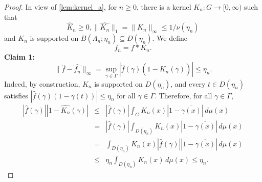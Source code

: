 \begin{proof}
In view of \cref{lem:kernel_a}, for $n \geq 0$, there is a kernel $K_n: G \to [0, \infty)$ such that
    \[
        \widehat{K}_n \geq 0,  \| \widehat{K_n}\|_1 = \lVert K_n \rVert_{\infty} \leq 1/\nu(\eta_n)
    \]
    and $K_n$ is supported on $B(\Lambda_n; \eta_n) \subseteq D(\eta_n)$. 
    We define
    \[
        f_n = f * K_n.
    \]
	\noindent \textbf{Claim 1:} 
	\[
	\| \widehat{f} - \widehat{f_n} \|_{\infty} = \sup_{\gamma \in \Gamma} \left| \widehat{f}(\gamma) (1-\widehat{K_n}(\gamma)) \right| \leq \eta_n.
	\]
	Indeed, by construction, $K_n$ is supported on $D(\eta_n)$, and every $t \in D(\eta_n)$ satisfies $\left| \widehat{f}(\gamma) (1 - \gamma(t)) \right| \leq \eta_n$ for all $\gamma \in \Gamma$. Therefore, for all $\gamma \in \Gamma$,
	\begin{eqnarray*}
	\left| \widehat{f}(\gamma) \right| \left| 1-\widehat{K_n}(\gamma) \right| 
	&\leq& 
	\left| \widehat{f}(\gamma) \right| \int_{G} K_n(x) \left| 1-\overline{\gamma(x)} \right| \, d\mu(x) \\
	&=& \left| \widehat{f}(\gamma) \right| \int_{D(\eta_n)} K_n(x) \left| 1-\overline{\gamma(x)} \right| \, d\mu(x) \\
	&=& \int_{D(\eta_n)} K_n(x) \left| \widehat{f}(\gamma) \right| \left| 1-\overline{\gamma(x)} \right| \, d\mu(x)\\
	&\leq& \eta_n \int_{D(\eta_n)} K_n(x) \, d\mu(x) \leq \eta_n.
	\end{eqnarray*}
	

\end{proof}
